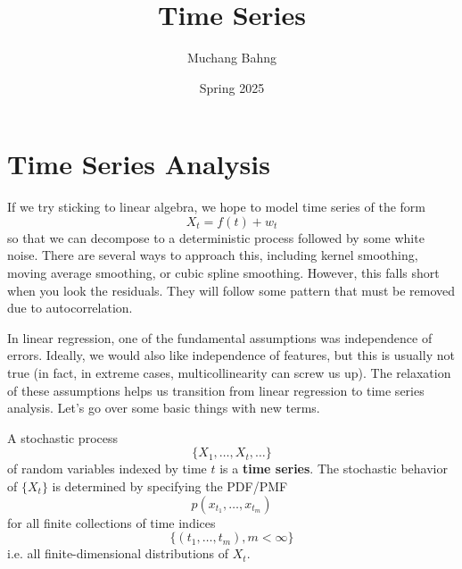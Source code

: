 \documentclass{article}
\begin{document}
\title{Time Series}
\author{Muchang Bahng}
\date{Spring 2025}

\maketitle
\tableofcontents
\pagebreak

\section{Time Series Analysis}

    If we try sticking to linear algebra, we hope to model time series of the form 
    \begin{equation}
      X_t = f(t) + w_t
    \end{equation}
    so that we can decompose to a deterministic process followed by some white noise. There are several ways to approach this, including kernel smoothing, moving average smoothing, or cubic spline smoothing. However, this falls short when you look the residuals. They will follow some pattern that must be removed due to autocorrelation. 

    In linear regression, one of the fundamental assumptions was  independence of errors. Ideally, we would also like independence of features, but this is usually not true (in fact, in extreme cases, multicollinearity can screw us up). The relaxation of these assumptions helps us transition from linear regression to time series analysis. Let's go over some basic things with new terms. 

    \begin{definition}
      A stochastic process 
      \begin{equation}
        \{X_1, \ldots, X_t, \ldots \}
      \end{equation}
      of random variables indexed by time $t$ is a \textbf{time series}. The stochastic behavior of $\{X_t\}$ is determined by specifying the PDF/PMF 
      \begin{equation}
        p(x_{t_1}, \ldots, x_{t_m}) 
      \end{equation}
      for all finite collections of time indices 
      \begin{equation}
        \{(t_1, \ldots, t_m), m < \infty \}
      \end{equation}
      i.e. all finite-dimensional distributions of $X_t$. 
    \end{definition}
\end{document}
